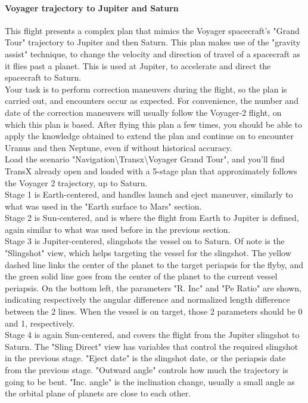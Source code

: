 \documentclass[Orbiter User Manual.tex]{subfiles}
\begin{document}
\paragraph{Voyager trajectory to Jupiter and Saturn}
This flight presents a complex plan that mimics the Voyager spacecraft's "Grand Tour" trajectory to Jupiter and then Saturn. This plan makes use of the "gravity assist" technique, to change the velocity and direction of travel of a spacecraft as it flies past a planet. This is used at Jupiter, to accelerate and direct the spacecraft to Saturn.\\
Your task is to perform correction maneuvers during the flight, so the plan is carried out, and encounters occur as expected. For convenience, the number and date of the correction maneuvers will usually follow the Voyager-2 flight, on which this plan is based. After flying this plan a few times, you should be able to apply the knowledge obtained to extend the plan and continue on to encounter Uranus and then Neptune, even if without historical accuracy.\\
Load the scenario "Navigation\textbackslash Transx\textbackslash Voyager Grand Tour", and you'll find TransX already open and loaded with a 5-stage plan that approximately follows the Voyager 2 trajectory, up to Saturn.\\
Stage 1 is Earth-centered, and handles launch and eject maneuver, similarly to what was used in the "Earth surface to Mars" section.\\
Stage 2 is Sun-centered, and is where the flight from Earth to Jupiter is defined, again similar to what was used before in the previous section.\\
Stage 3 is Jupiter-centered, slingshots the vessel on to Saturn. Of note is the "Slingshot" view, which helps targeting the vessel for the slingshot. The yellow dashed line links the center of the planet to the target periapsis for the flyby, and the green solid line goes from the center of the planet to the current vessel periapsis. On the bottom left, the parameters "R. Inc" and "Pe Ratio" are shown, indicating respectively the angular difference and normalized length difference between the 2 lines. When the vessel is on target, those 2 parameters should be 0 and 1, respectively.\\
Stage 4 is again Sun-centered, and covers the flight from the Jupiter slingshot to Saturn. The "Sling Direct" view has variables that control the required slingshot in the previous stage. "Eject date" is the slingshot date, or the periapsis date from the previous stage. "Outward angle" controls how much the trajectory is going to be bent. "Inc. angle" is the inclination change, usually a small angle as the orbital plane of planets are close to each other.\\
\end{document}
